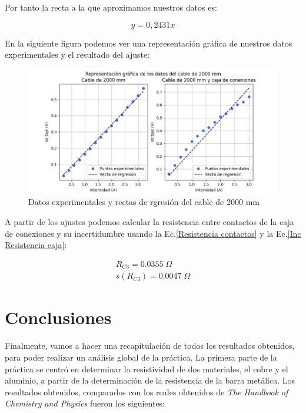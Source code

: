 \documentclass[a4paper,12pt,titlepage]{report}
\begin{document}
Por tanto la recta a la que aproximamos nuestros datos es:

\begin{equation}
    y = 0,2431x
\end{equation}

En la siguiente figura podemos ver una representación gráfica de nuestros datos experimentales y el resultado del ajuste:

\begin{figure}[h!]
    \centering
    \includegraphics[width=0.95\linewidth]{Images/plotCable3.png}
    \caption{Datos experimentales y rectas de rgresión del cable de 2000 mm}
\end{figure}

\newpage

A partir de los ajustes podemos calcular la resistencia entre contactos de la caja de conexiones y su incertidumbre usando la Ec.\ref{Resistencia contactos} y la Ec.\ref{Inc Resistencia caja}:

\begin{equation}
    \begin{gathered}
        R_{C3} = 0.0355 \; \Omega\\
        s(R_{C3}) = 0.0047\; \Omega
    \end{gathered}
\end{equation}




\newpage

\section{Conclusiones}

Finalmente, vamos a hacer una recapitulación de todos los resultados obtenidos, para poder realizar un análisis global de la práctica. La primera parte de la práctica se centró en determinar la resistividad de dos materiales, el cobre y el aluminio, a partir de la determinación de la resistencia de la barra metálica. Los resultados obtenidos, comparados con los reales obtenidos de \textit{The Handbook of Chemistry and Physics} fueron los siguientes:
\end{document}
